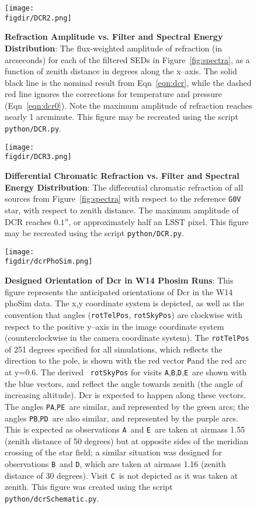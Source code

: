 \documentclass[prd, nofootinbib, floatfix, 11pt, tightenlines, times]{article}
\def\figdir{../figures}
\def\A{{\tt A}}
\def\B{{\tt B}}
\def\C{{\tt C}}
\def\D{{\tt D}}
\def\E{{\tt E}}
\def\P{{\tt P}}
\begin{document}
\clearpage
\begin{figure}[h!]
  \centering
  \texttt{[image: \\figdir/DCR2.png]}
  \caption{{\bf Refraction Amplitude vs. Filter and Spectral Energy
      Distribution}: The flux-weighted amplitude of refraction (in
    arcseconds) for each of the filtered SEDs in
    Figure~\ref{fig:spectra}, as a function of zenith distance in
    degrees along the x--axis.  The solid black line is the nominal
    result from Eqn~\ref{eqn:dcr}, while the dashed red line ignores
    the corrections for temperature and pressure (Eqn~\ref{eqn:dcr0}).
    Note the maximum amplitude of refraction reaches nearly 1
    arcminute.  This figure may be recreated using the script {\tt
      python/DCR.py}.}
  \label{fig:refraction}
\end{figure}

\clearpage
\begin{figure}[h!]
  \centering
  \texttt{[image: \\figdir/DCR3.png]}
  \caption{{\bf Differential Chromatic Refraction vs. Filter and
      Spectral Energy Distribution}: The differential chromatic
    refraction of all sources from Figure~\ref{fig:spectra} with
    respect to the reference {\tt G0V} star, with respect to zenith
    distance.  The maximum amplitude of DCR reaches $0.1''$, or
    approximately half an LSST pixel.  This figure may be recreated
    using the script {\tt python/DCR.py}.}
  \label{fig:dcr}
\end{figure}

\begin{figure}[h!]
  \centering
  \texttt{[image: \\figdir/dcrPhoSim.png]}
  \caption{{\bf Designed Orientation of Dcr in W14 Phosim Runs}: This
    figure represents the anticipated orientations of Dcr in the W14
    phoSim data.  The x,y coordinate system is depicted, as well as
    the convention that angles ({\tt rotTelPos}, {\tt rotSkyPos}) are
    clockwise with respect to the positive y--axis in the image
    coordinate system (counterclockwise in the camera coordinate
    system).  The {\tt rotTelPos} of 251 degrees specified for all
    simulations, which reflects the direction to the pole, is shown
    with the red vector \P and the red arc at y=0.6.  The derived {\tt
      rotSkyPos} for visits \A,\B,\D,\E\ are shown with the blue
    vectors, and reflect the angle towards zenith (the angle of
    increasing altitude).  Dcr is expected to happen along these
    vectors.  The angles \P\A,\P\E\ are similar, and represented by
    the green arcs; the angles \P\B,\P\D\ are also similar, and
    represented by the purple arcs.  This is expected as observations
    \A\ and \E\ are taken at airmass 1.55 (zenith distance of 50
    degrees) but at opposite sides of the meridian crossing of the
    star field; a similar situation was designed for observations
    \B\ and \D, which are taken at airmass 1.16 (zenith distance of 30
    degrees).  Visit \C\ is not depicted as it was taken at zenith.
    This figure was created using the script {\tt
      python/dcrSchematic.py}.}
  \label{fig:phosimdcr}
\end{figure}
\end{document}
